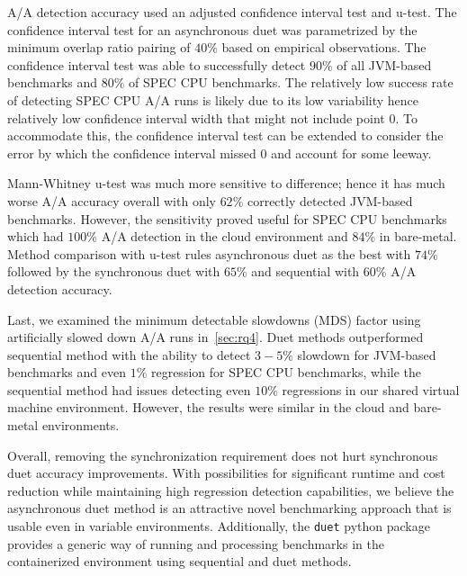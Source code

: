 A/A detection accuracy used an adjusted confidence interval test and \mbox{u-test}.
The confidence interval test for an asynchronous duet was parametrized by the minimum overlap ratio pairing of $40\%$ based on empirical observations.
The confidence interval test was able to successfully detect $90\%$ of all \mbox{JVM-based} benchmarks and $80\%$ of SPEC CPU benchmarks.
The relatively low success rate of detecting SPEC CPU A/A runs is likely due to its low variability hence relatively low confidence interval width that might not include point $0$.
To accommodate this, the confidence interval test can be extended to consider the error by which the confidence interval missed $0$ and account for some leeway.

\mbox{Mann-Whitney} \mbox{u-test} was much more sensitive to difference; hence it has much worse A/A accuracy overall with only $62\%$ correctly detected \mbox{JVM-based} benchmarks.
However, the sensitivity proved useful for SPEC CPU benchmarks which had $100\%$ A/A detection in the cloud environment and $84\%$ in \mbox{bare-metal}.
Method comparison with \mbox{u-test} rules asynchronous duet as the best with $74\%$ followed by the synchronous duet with $65\%$ and sequential with $60\%$ A/A detection accuracy.

Last, we examined the minimum detectable slowdowns (MDS) factor using artificially slowed down A/A runs in~\cref{sec:rq4}.
Duet methods outperformed sequential method with the ability to detect $3-5\%$ slowdown for \mbox{JVM-based} benchmarks and even $1\%$ regression for SPEC CPU benchmarks, while the sequential method had issues detecting even $10\%$ regressions in our shared virtual machine environment.
However, the results were similar in the cloud and bare-metal environments.

Overall, removing the synchronization requirement does not hurt synchronous duet accuracy improvements.
With possibilities for significant runtime and cost reduction while maintaining high regression detection capabilities, we believe the asynchronous duet method is an attractive novel benchmarking approach that is usable even in variable environments.
Additionally, the \lstinline{duet} python package provides a generic way of running and processing benchmarks in the containerized environment using sequential and duet methods.

